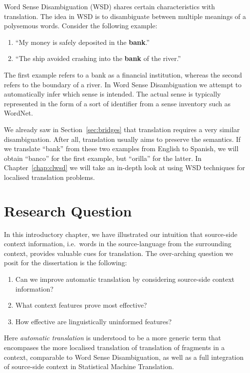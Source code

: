 Word Sense Disambiguation (WSD) shares certain characteristics with
translation. The idea in WSD is to disambiguate between multiple meanings of a
polysemous words. Consider the following example: 

\begin{enumerate}
\item ``My money is safely deposited in the \textbf{bank}.''
\item ``The ship avoided crashing into the \textbf{bank} of the river.''
\end{enumerate}

The first example refers to a bank as a financial institution, whereas the
second refers to the boundary of a river. In Word Sense Disambiguation we
attempt to automatically infer which sense is intended. The actual sense is
typically represented in the form of a sort of identifier from a sense inventory
such as WordNet.

We already saw in Section~\ref{sec:bridges} that translation requires a very
similar disambiguation. After all, translation usually aims to preserve the
semantics. If we translate ``bank'' from these two examples from English to
Spanish, we will obtain ``banco'' for the first example, but ``orilla'' for the
latter. In Chapter~\ref{chap:clwsd} we will take an in-depth look at using
WSD techniques for localised translation problems.

\section{Research Question}
\label{sec:overallresearchquestion}

In this introductory chapter, we have illustrated our intuition that
source-side context information, i.e.\ words in the source-language from the
surrounding context, provides valuable cues for translation. The over-arching
question we posit for the dissertation is the following:

\begin{enumerate}
\item Can we improve automatic translation by considering source-side context information? 
\item What context features prove most effective?
\item How effective are linguistically uninformed features?
\end{enumerate}

Here \emph{automatic translation} is understood to be a more generic term that
encompases the more localised translation of translation of fragments in a
context, comparable to Word Sense Disambiguation, as well as a full integration
of source-side context in Statistical Machine Translation.

